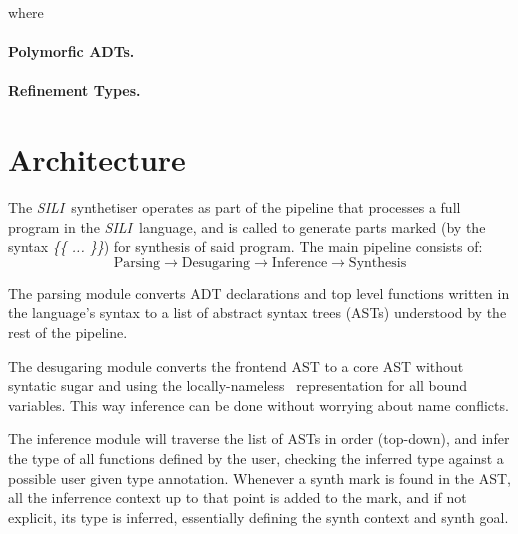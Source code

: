 \documentclass{llncs}
\newcommand{\mypara}[1]{\paragraph{\textbf{#1}.}}
\newcommand{\synname}{\emph{SILI}}
\begin{document}
where



\mypara{Polymorfic ADTs}

\mypara{Refinement Types}



\section{Architecture}

The \synname\ synthetiser operates as part of the pipeline that processes a
full program in the \synname\ language, and is called to generate parts marked
(by the syntax \emph{\{\{ ... \}\}}) for
synthesis of said program. The main pipeline consists of:
\[
    \textrm{Parsing} \rightarrow \textrm{Desugaring} \rightarrow \textrm{Inference} \rightarrow \textrm{Synthesis}
\]

The parsing module converts ADT declarations and top level functions written in
the language's syntax to a list of abstract syntax trees (ASTs) understood by the rest of the
pipeline.

The desugaring module converts the frontend AST to a core AST without syntatic
sugar and using the locally-nameless~\cite{locally nameless} representation for
all bound variables.  This way inference can be done without worrying about name
conflicts.

The inference module will traverse the list of ASTs in order (top-down), and
infer the type of all functions defined by the user, checking the inferred
type against a possible user given type annotation. Whenever a synth mark is
found in the AST, all the inferrence context up to that point is added to the
mark, and if not explicit, its type is inferred, essentially defining the synth
context and synth goal.
\end{document}
